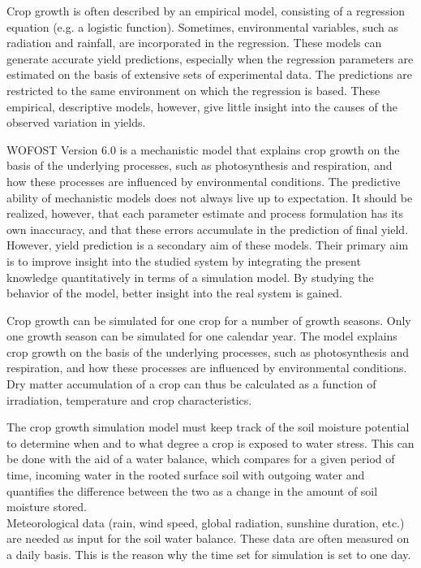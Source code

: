 Crop growth is often described by an empirical model, consisting of a regression
equation (e.g. a logistic function). Sometimes, environmental variables, such as
radiation and rainfall, are incorporated in the regression. These models can generate
accurate yield predictions, especially when the regression parameters are estimated on
the basis of extensive sets of experimental data. The predictions are restricted to the
same environment on which the regression is based. These empirical, descriptive
models, however, give little insight into the causes of the observed variation in yields. 

WOFOST Version 6.0 is a mechanistic model that explains crop growth on the basis
of the underlying processes, such as photosynthesis and respiration, and how these
processes are influenced by environmental conditions. The predictive ability of
mechanistic models does not always live up to expectation. It should be realized,
however, that each parameter estimate and process formulation has its own inaccura\-cy, 
and that these errors accumulate in the prediction of final yield. However, yield
prediction is a secondary aim of these models. Their primary aim is to improve
insight into the studied system by integrating the present knowl\-edge quantitatively in
terms of a simulation model. By studying the behavior of the model, better insight
into the real system is gained.

Crop growth can be simulated for one crop for a number of growth seasons. Only
one growth season can be simulated for one calendar year.  The model explains crop
growth on the basis of the underly\-ing processes, such as photosynthesis and respira\-tion, 
and how these processes are influenced by environmental conditions. \\
Dry matter accumulation of a crop can thus be calculated as a function of irradiation,
temperature and crop characteristics.

The crop growth simulation model must keep track of the soil moisture potential to
deter\-mine when and to what degree a crop is exposed to water stress. This can be
done with the aid of a water balance, which compares for a given period of time,
incoming water in the rooted surface soil with outgoing water and quantifies the
difference between the two as a change in the amount of soil moisture stored.\\
Meteorological data (rain, wind speed, global radiation, sunshine duration, etc.) are
needed as input for the soil water balance. These data are often measured on a daily
basis. This is the reason why the time set for simulation is set to one day. \\

